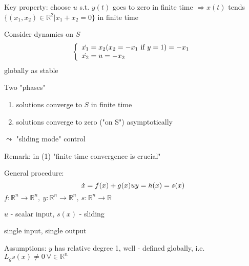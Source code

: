 
Key property: choose $u$ s.t. $y(t)$ goes to zero in finite time $\Rightarrow x(t)$ tends $\{ (x_1, x_2) \in \mathbb{R}^2 | x_1 +x_2 = 0 \}$ in finite time

Consider dynamics on $S$
\begin{equation*}
\left\{ \begin{array}{l}
                  \dot{x_1} = x_2 (x_2 = -x_1 \ $if$ \  y =1) = -x_1\\
                 \dot{x_2} = u = -x_2
                \end{array}
              \right. 
\end{equation*} 
globally as stable


Two "phases"
\begin{enumerate}
\item solutions converge to $S$ in finite time
\item solutions converge to zero ("on S") asymptotically
\end{enumerate}
$\leadsto $ "sliding mode" control

Remark: in (1) "finite time convergence is crucial"

General procedure:
\begin{equation*}
\dot{x} = f(x)+g(x)u \\
y = h(x)= s(x)
\end{equation*}
$f: \mathbb{R}^n \to \mathbb{R}^n, \  y : \mathbb{R}^n \to \mathbb{R}^n, \ s: \mathbb{R}^n \to \mathbb{R}$

$u$ - scalar input, $s(x)$ - sliding

single input, single output 

Assumptions: $y$ has relative degree 1, well - defined globally, i.e. $L_gs(x) \neq 0 \ \forall \in \mathbb{R}^n$

